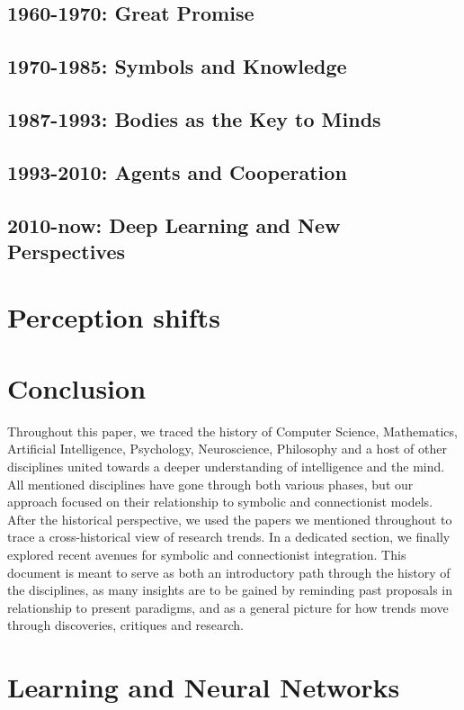 \documentclass[oneside,notitlepage]{report}
\begin{document}
\section{1960-1970: Great Promise}


\section{1970-1985: Symbols and Knowledge}


\section{1987-1993: Bodies as the Key to Minds}


\section{1993-2010: Agents and Cooperation}


\section{2010-now: Deep Learning and New Perspectives}


\chapter{Perception shifts}




\chapter{Conclusion}

Throughout this paper, we traced the history of Computer Science, Mathematics, Artificial Intelligence, Psychology, Neuroscience, Philosophy and a host of other disciplines united towards a deeper understanding of intelligence and the mind. All mentioned disciplines have gone through both various phases, but our approach focused on their relationship to symbolic and connectionist models. After the historical perspective, we used the papers we mentioned throughout to trace a cross-historical view of research trends. In a dedicated section, we finally explored recent avenues for symbolic and connectionist integration. This document is meant to serve as both an introductory path through the history of the disciplines, as many insights are to be gained by reminding past proposals in relationship to present paradigms, and as a general picture for how trends move through discoveries, critiques and research.

\appendix
\chapter{Learning and Neural Networks}


\printbibliography
\end{document}
